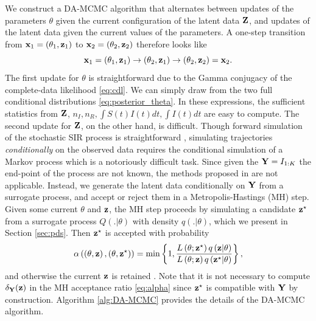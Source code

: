 \documentclass[11pt]{article}
\begin{document}
	We construct a DA-MCMC algorithm that alternates between updates of the parameters $\theta$ given the current configuration of the latent data $\mathbf{Z}$, and updates of the latent data given the current values of the parameters. A one-step transition from $\mathbf{x}_1 = (\theta_1, \mathbf{z}_1)$ to $\mathbf{x}_2 = (\theta_2, \mathbf{z}_2)$ therefore looks like
	$$\mathbf{x}_1 = (\theta_1, \mathbf{z}_1) \rightarrow (\theta_2, \mathbf{z}_1) \rightarrow (\theta_2, \mathbf{z}_2) = \mathbf{x}_2.$$
	The first update for $\theta$ is straightforward due to the Gamma conjugacy of the complete-data likelihood \eqref{eq:cdl}. We can simply draw from the two full conditional distributions \eqref{eq:posterior_theta}. In these expressions, the sufficient statistics from $\mathbf{Z}$, $n_I, n_R, \int S(t)I(t) dt, \int I(t) dt$ are easy to compute.
	The second update for $\mathbf{Z}$, on the other hand, is difficult. Though forward simulation of the stochastic SIR process is straightforward \cite{Gillespie.1977}, simulating trajectories \textit{conditionally} on the observed data requires the conditional simulation of a Markov process which is a notoriously difficult task. Since given the $\mathbf{Y} = I_{1:K}$ the end-point of the process are not known, the methods proposed in \cite{Hobolth.2009} are not applicable.
	Instead, we generate the latent data conditionally on $\mathbf{Y}$ from a surrogate process, and accept or reject them in a Metropolis-Hastings (MH) step. Given some current $\theta$ and $\mathbf{z}$, the MH step proceeds by simulating a candidate $\mathbf{z}^\star$ from a surrogate process $Q(.|\theta)$ with density $q(.|\theta)$, which we present in Section \eqref{sec:pds}. Then $\mathbf{z}^\star$ is accepted with probability
	\begin{equation}
		\label{eq:alpha}
		\alpha\left( \left( \theta, \mathbf{z}\right) , \left( \theta, \mathbf{z}^\star\right) \right) =	\min\left\lbrace 1, \dfrac{L\left( \theta; \mathbf{z}^\star\right) q\left( \mathbf{z}|\theta\right)}{L\left( \theta;\mathbf{z}\right) q\left( \mathbf{z}^\star|\theta\right)}\right\rbrace,
	\end{equation}
	and otherwise the current $\mathbf{z}$ is retained \cite{Tierney.1994}. Note that it is not necessary to compute $\delta_{\mathbf{Y}}(\mathbf{z})$ in the MH acceptance ratio \eqref{eq:alpha} since $\mathbf{z}^\star$ is compatible with $\mathbf{Y}$ by construction. Algorithm \ref{alg:DA-MCMC} provides the details of the DA-MCMC algorithm.
	
\end{document}
